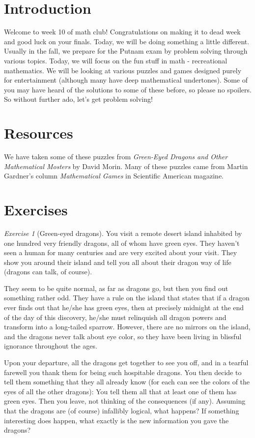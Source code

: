 \documentclass{article}
\theoremstyle{definition}
\theoremstyle{remark}
\newtheorem{exercise}{Exercise}
\begin{document}
\section{Introduction}

    Welcome to week 10 of math club! Congratulations on making it to dead week and good luck on your finals. Today, we will be doing something a little different. Usually in the fall, we prepare for the Putnam exam by problem solving through various topics. Today, we will focus on the fun stuff in math - recreational mathematics. We will be looking at various puzzles and games designed purely for entertainment (although many have deep mathematical undertones). Some of you may have heard of the solutions to some of these before, so please no spoilers. So without further ado, let's get problem solving!

\section{Resources}

    We have taken some of these puzzles from \textit{Green-Eyed Dragons and Other Mathematical Mosters} by David Morin. Many of these puzzles came from Martin Gardner's column \textit{Mathematical Games} in Scientific American magazine.

\section{Exercises}

    \begin{exercise}[Green-eyed dragons]
        You visit a remote desert island inhabited by one hundred very friendly dragons, all of whom have green eyes. They haven’t seen a human for many centuries and are very excited about your visit. They show you around their island and tell you all about their dragon way of life (dragons can talk, of course).
    
        They seem to be quite normal, as far as dragons go, but then you find out something rather odd. They have a rule on the island that states that if a dragon ever finds out that he/she has green eyes, then at precisely midnight at the end of the day of this discovery, he/she must relinquish all dragon powers and transform into a long-tailed sparrow. However, there are no mirrors on the island, and the dragons never talk about eye color, so they have been living in blissful ignorance throughout the ages.

        Upon your departure, all the dragons get together to see you off, and in a tearful farewell you thank them for being such hospitable dragons. You then decide to tell them something that they all already know (for each can see the colors of the eyes of all the other dragons): You tell them all that at least one of them has green eyes. Then you leave, not thinking of the consequences (if any). Assuming that the dragons are (of course) infallibly logical, what happens? If something interesting does happen, what exactly is the new information you gave the dragons?
    \end{exercise}
    
\end{document}
